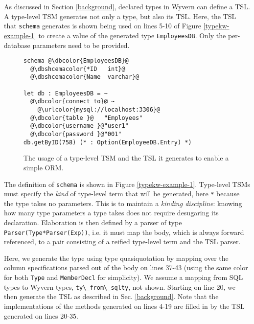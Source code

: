\documentclass{sig-alternate}[10pt]
\newcommand{\urlcolor}[1]{\textcolor[HTML]{FFCC33}{#1}}
\newcommand{\dbcolor}[1]{\textcolor[HTML]{2F276F}{#1}}
\newcommand{\dbshcemacolor}[1]{\textcolor[HTML]{5AC3D1}{#1}}
\newcommand{\mycaption}[1]{\vspace{-10px}\caption{#1}\vspace{-8px}}
\newcommand{\lstinlinew}[1]{\lstinline[style=wyvern]{#1}}
\begin{document}
As discussed in Section \ref{background}, declared types in Wyvern can define a TSL. A type-level TSM   generates not only a type, but also its TSL. Here, the TSL that \lstinlinew{schema} generates is shown being used on lines 5-10 of Figure \ref{typekw-example-1} to create a value of the generated type \lstinlinew{EmployeesDB}. Only the per-database parameters need to be provided. %

\begin{figure}[t]
\begin{lstlisting}[style=wyvern]
schema @\dbcolor{EmployeesDB}@
  @\dbshcemacolor{*ID   int}@
  @\dbshcemacolor{Name  varchar}@

let db : EmployeesDB = ~
  @\dbcolor{connect to}@ ~
    @\urlcolor{mysql://localhost:3306}@
  @\dbcolor{table }@   "Employees"
  @\dbcolor{username }@"user1"
  @\dbcolor{password }@"001"
db.getByID(758) (* : Option(EmployeeDB.Entry) *)
\end{lstlisting}
\mycaption{The usage of a type-level TSM and the TSL it generates to enable a simple ORM.}
\label{f-tykwexample}
\end{figure}
  

The definition of \lstinlinew{schema} is shown in Figure \ref{typekw-example-1}. Type-level TSMs must specify the \emph{kind} of type-level term that will be generated, here \lstinlinew{*} because the type takes no parameters. This is to maintain a \emph{kinding discipline}: knowing how many type parameters a type takes does not require desugaring its declaration. Elaboration is then defined by a parser of type \lstinlinew{Parser(Type*Parser(Exp))}, i.e. it must map the body, which is always forward referenced, to a pair consisting of a reified type-level term and the TSL parser. 

Here, we generate the type using type quasiquotation by mapping over the column specifications parsed out of the body on lines 37-43 (using the same color for both \lstinlinew{Type} and \lstinlinew{MemberDecl} for simplicity). We assume a mapping from SQL types to Wyvern types, \lstinlinew{ty\_from\_sqlty}, not shown. Starting on line 20, we then generate the TSL as described in Sec. \ref{background}. Note  that the implementations of the methods generated on lines 4-19 are filled in by the TSL generated on lines 20-35.
\end{document}
